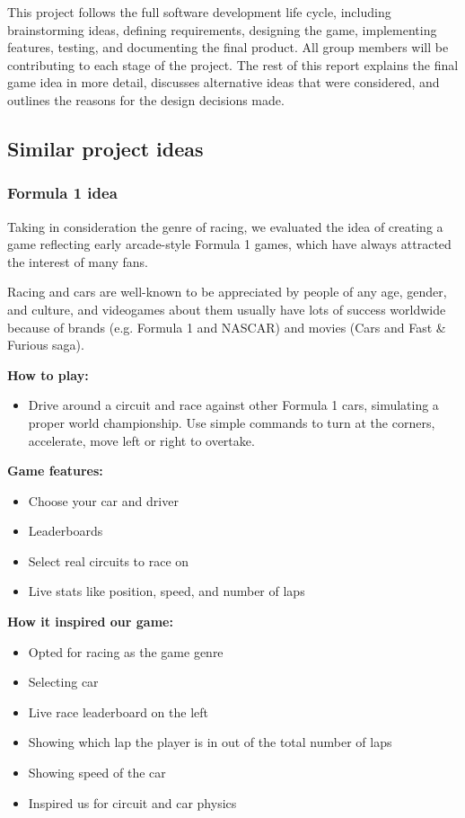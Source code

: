 \documentclass[12pt]{article}
\begin{document}
This project follows the full software development life cycle, including brainstorming ideas, defining requirements, designing the game, implementing features, testing, and documenting the final product. All group members will be contributing to each stage of the project. The rest of this report explains the final game idea in more detail, discusses alternative ideas that were considered, and outlines the reasons for the design decisions made.

\subsection{Similar project ideas}

\subsubsection{Formula 1 idea}

Taking in consideration the genre of racing, we evaluated the idea of creating a game reflecting early arcade-style Formula 1 games, which have always attracted the interest of many fans.\parencite{maxdownforce,formula1ps1}

Racing and cars are well-known to be appreciated by people of any age, gender, and culture, and videogames about them usually have lots of success worldwide because of brands (e.g. Formula 1 and NASCAR) and movies (Cars and Fast \& Furious saga).
\vspace{4pt}

\noindent\textbf{How to play:}
\begin{itemize}
\item Drive around a circuit and race against other Formula 1 cars, simulating a proper world championship. Use simple commands to turn at the corners, accelerate, move left or right to overtake.
\end{itemize}

\noindent\textbf{Game features:}
\begin{itemize}
\item Choose your car and driver
\item Leaderboards
\item Select real circuits to race on
\item Live stats like position, speed, and number of laps
\end{itemize}

\noindent\textbf{How it inspired our game:}
\begin{itemize}
\item Opted for racing as the game genre
\item Selecting car
\item Live race leaderboard on the left
\item Showing which lap the player is in out of the total number of laps
\item Showing speed of the car
\item Inspired us for circuit and car physics
\end{itemize}
\end{document}
